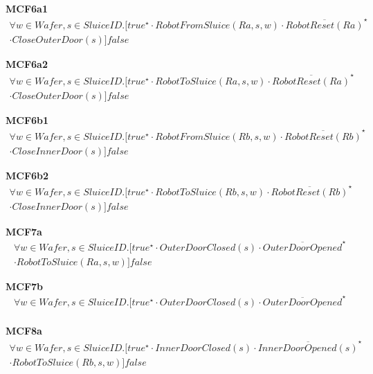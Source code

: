 \documentclass[12pt]{report}
\begin{document}
    \textbf{MCF6a1}
    \begin{multline*}
        \forall w \in \mathit{Wafer}, s \in SluiceID.[true^{\star} \cdot RobotFromSluice(Ra,s,w) \cdot \overline{RobotReset(Ra)}^{\star}\\
        \cdot CloseOuterDoor(s)]false
    \end{multline*}

    \textbf{MCF6a2}
    \begin{multline*}
        \forall w \in \mathit{Wafer}, s \in SluiceID.[true^{\star} \cdot RobotToSluice(Ra,s,w) \cdot \overline{RobotReset(Ra)}^{\star} \\
        \cdot CloseOuterDoor(s)]false
    \end{multline*}
	
    \textbf{MCF6b1}
    \begin{multline*}
        \forall w \in \mathit{Wafer}, s \in SluiceID.[true^{\star} \cdot RobotFromSluice(Rb,s,w) \cdot \overline{RobotReset(Rb)}^{\star}\\
        \cdot CloseInnerDoor(s)]false
    \end{multline*}

    \textbf{MCF6b2}
    \begin{multline*}
        \forall w \in \mathit{Wafer}, s \in SluiceID.[true^{\star} \cdot RobotToSluice(Rb,s,w) \cdot \overline{RobotReset(Rb)}^{\star} \\
        \cdot CloseInnerDoor(s)]false
    \end{multline*}

    \textbf{MCF7a}
    \begin{multline*}
        \forall w \in \mathit{Wafer}, s \in SluiceID.[true^{\star} \cdot OuterDoorClosed(s) \cdot \overline{OuterDoorOpened}^{\star} \\
        \cdot RobotToSluice(Ra,s,w)]false
    \end{multline*}

    \textbf{MCF7b}
    \begin{multline*}
        \forall w \in \mathit{Wafer}, s \in SluiceID.[true^{\star} \cdot OuterDoorClosed(s) \cdot \overline{OuterDoorOpened}^{\star} \\
    \end{multline*}

    \textbf{MCF8a}
    \begin{multline*}
        \forall w \in \mathit{Wafer}, s \in SluiceID.[true^{\star} \cdot InnerDoorClosed(s) \cdot \overline{InnerDoorOpened(s)}^{\star} \\
        \cdot RobotToSluice(Rb, s, w)]false
    \end{multline*}
\end{document}
